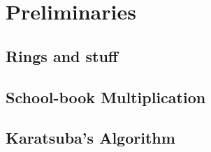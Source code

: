 \chapter{Preliminaries}\label{preliminaries}

\section{Rings and stuff}
\label{sec:prelim-rings}

\section{School-book Multiplication}
\label{sec:prelim-schoolbook}

\section{Karatsuba's Algorithm}
\label{sec:prelim-karatsuba}


